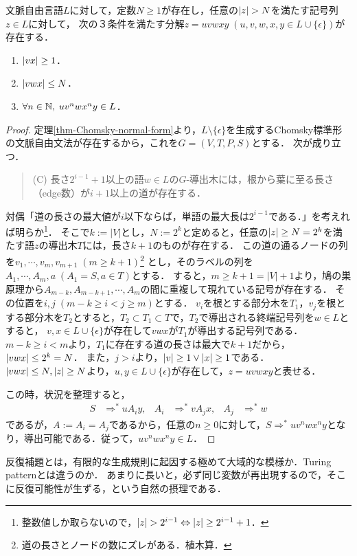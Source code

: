 \documentclass[uplatex, dvipdfmx]{jsreport}
\begin{document}
\begin{theorem}\label{thm-Pumping-lemma-CFL}
    文脈自由言語$L$に対して，定数$N\ge 1$が存在し，任意の$\lvert z\rvert>N$を満たす記号列$z\in L$に対して，
    次の３条件を満たす分解$z=uvwxy\;(u,v,w,x,y\in L\cup\{\epsilon\})$が存在する．
    \begin{enumerate}
        \item $\lvert vx\rvert\ge 1$．
        \item $\lvert vwx\rvert\le N$．
        \item $\forall n\in\mathbb{N},\;uv^nwx^ny\in L$．
    \end{enumerate}
\end{theorem}
\begin{proof}
    定理\ref{thm-Chomsky-normal-form}より，$L\setminus\{\epsilon\}$を生成するChomsky標準形の文脈自由文法が存在するから，これを$G=(V,T,P,S)$とする．
    次が成り立つ．
    \begin{quote}
        (C) 長さ$2^{i-1}+1$以上の語$w\in L$の$G$-導出木には，根から葉に至る長さ（edge数）が$i+1$以上の道が存在する．
    \end{quote}
    対偶「道の長さの最大値が$i$以下ならば，単語の最大長は$2^{i-1}$である．」を考えれば明らか\footnote{整数値しか取らないので，$\lvert z\rvert>2^{i-1}\Leftrightarrow\lvert z\rvert\ge 2^{i-1}+1$．}．
    そこで$k:=|V|$とし，$N:=2^k$と定めると，任意の$\lvert z\rvert\ge N=2^k$を満たす語$z$の導出木$T$には，長さ$k+1$のものが存在する．
    この道の通るノードの列を$v_1,\cdots,v_m,v_{m+1}\;(m\ge k+1)$\footnote{道の長さとノードの数にズレがある．植木算．}
    とし，そのラベルの列を$A_1,\cdots,A_m,a\;(A_1=S,a\in T)$とする．
    すると，$m\ge k+1=|V|+1$より，鳩の巣原理から$A_{m-k},A_{m-k+1},\cdots,A_m$の間に重複して現れている記号が存在する．
    その位置を$i,j\;(m-k\ge i<j\ge m)$とする．
    $v_i$を根とする部分木を$T_1$，$v_j$を根とする部分木を$T_2$とすると，$T_2\subset T_1\subset T$で，$T_2$で導出される終端記号列を$w\in L$とすると，
    $v,x\in L\cup\{\epsilon\}$が存在して$vwx$が$T_1$が導出する記号列である．
    $m-k\ge i< m$より，$T_1$に存在する道の長さは最大で$k+1$だから，$\lvert vwx\rvert\le 2^k=N$．
    また，$j>i$より，$\lvert v\rvert\ge 1\lor\lvert x\rvert\ge 1$である．
    $\lvert vwx\rvert\le N,\lvert z\rvert\ge N$より，$u,y\in L\cup\{\epsilon\}$が存在して，$z=uvwxy$と表せる．

    この時，状況を整理すると，
    \begin{align*}
        S&\Rightarrow^*uA_iy,&A_i&\Rightarrow^*vA_jx,&A_j&\Rightarrow^*w
    \end{align*}
    であるが，$A:=A_i=A_j$であるから，任意の$n\ge 0$に対して，$S\Rightarrow^*uv^nwx^ny$となり，導出可能である．従って，$uv^nwx^ny\in L$．
\end{proof}
\begin{remarks}
    反復補題とは，有限的な生成規則に起因する極めて大域的な模様か．Turing patternとは違うのか．
    あまりに長いと，必ず同じ変数が再出現するので，そこに反復可能性が生ずる，という自然の摂理である．
\end{remarks}
\end{document}
